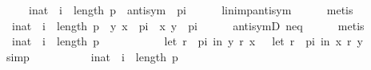\begin{isabellebody}
\isanewline
\ \ \ \ {\isachardoublequoteopen}{\isasymforall}\ i{\isacharcolon}{\kern0pt}{\isacharcolon}{\kern0pt}nat\ {\isachardot}{\kern0pt}\ i\ {\isacharless}{\kern0pt}\ length\ p\ {\isasymlongrightarrow}\ antisym\ \ {\isacharparenleft}{\kern0pt}p{\isacharbang}{\kern0pt}i{\isacharparenright}{\kern0pt}{\isachardoublequoteclose}\isanewline
\ \ \ \ \isamarkupfalse%
\ lin{\isacharunderscore}{\kern0pt}imp{\isacharunderscore}{\kern0pt}antisym\isanewline
\ \ \ \ \isamarkupfalse%
\ metis\isanewline
\ \ \isamarkupfalse%
\ {\isachardoublequoteopen}{\isasymforall}\ i{\isacharcolon}{\kern0pt}{\isacharcolon}{\kern0pt}nat\ {\isachardot}{\kern0pt}\ i\ {\isacharless}{\kern0pt}\ length\ p\ {\isasymlongrightarrow}\ {\isacharparenleft}{\kern0pt}{\isacharparenleft}{\kern0pt}y{\isacharcomma}{\kern0pt}\ x{\isacharparenright}{\kern0pt}\ {\isasymin}\ {\isacharparenleft}{\kern0pt}p{\isacharbang}{\kern0pt}i{\isacharparenright}{\kern0pt}\ {\isasymlongrightarrow}\ {\isacharparenleft}{\kern0pt}x{\isacharcomma}{\kern0pt}\ y{\isacharparenright}{\kern0pt}\ {\isasymnotin}\ {\isacharparenleft}{\kern0pt}p{\isacharbang}{\kern0pt}i{\isacharparenright}{\kern0pt}{\isacharparenright}{\kern0pt}{\isachardoublequoteclose}\isanewline
\ \ \ \ \isamarkupfalse%
\ antisymD\ neq\isanewline
\ \ \ \ \isamarkupfalse%
\ metis\isanewline
\ \ \isamarkupfalse%
\ {\isachardoublequoteopen}{\isasymforall}\ i{\isacharcolon}{\kern0pt}{\isacharcolon}{\kern0pt}nat\ {\isachardot}{\kern0pt}\ i\ {\isacharless}{\kern0pt}\ length\ p\ {\isasymlongrightarrow}\isanewline
\ \ \ \ \ \ \ \ \ \ {\isacharparenleft}{\kern0pt}{\isacharparenleft}{\kern0pt}let\ r\ {\isacharequal}{\kern0pt}\ {\isacharparenleft}{\kern0pt}p{\isacharbang}{\kern0pt}i{\isacharparenright}{\kern0pt}\ in\ {\isacharparenleft}{\kern0pt}y\ {\isasympreceq}\isactrlsub r\ x{\isacharparenright}{\kern0pt}{\isacharparenright}{\kern0pt}\ {\isasymlongrightarrow}\ {\isasymnot}\ {\isacharparenleft}{\kern0pt}let\ r\ {\isacharequal}{\kern0pt}\ {\isacharparenleft}{\kern0pt}p{\isacharbang}{\kern0pt}i{\isacharparenright}{\kern0pt}\ in\ {\isacharparenleft}{\kern0pt}x\ {\isasympreceq}\isactrlsub r\ y{\isacharparenright}{\kern0pt}{\isacharparenright}{\kern0pt}{\isacharparenright}{\kern0pt}{\isachardoublequoteclose}\isanewline
\ \ \ \ \isamarkupfalse%
\ simp\isanewline
\ \ \isamarkupfalse%
\ {}\ \isamarkupfalse%
\isanewline
\ \ \ \ {\isachardoublequoteopen}{\isasymforall}\ i{\isacharcolon}{\kern0pt}{\isacharcolon}{\kern0pt}nat\ {\isachardot}{\kern0pt}\ i\ {\isacharless}{\kern0pt}\ length\ p\ {\isasymlongrightarrow}\isanewline

\end{isabellebody}

